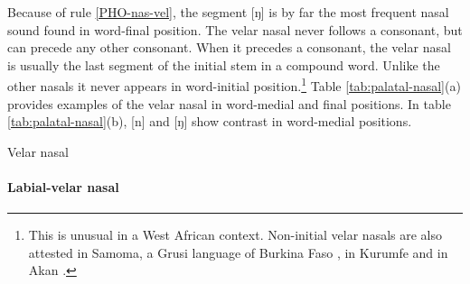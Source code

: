 Because of   rule  \ref{PHO-nas-vel}, the segment [ŋ] is by far the most
frequent nasal sound found in word-final position.  The velar nasal never
follows a consonant, but  can precede any other consonant. When it precedes a
consonant, the velar nasal is usually the last segment of the initial stem in a
compound word. Unlike the other nasals it never appears in word-initial
position.\footnote{This is unusual in  a West African context. Non-initial velar
nasals are also attested in Samoma, a Grusi language
of Burkina Faso
\cite[97]{Kedr97},  in Kurumfe \cite[389]{Renn97} and in Akan  \citep{Dolp88}.}
Table
\ref{tab:palatal-nasal}(a)  provides  examples of the velar nasal in word-medial
and
final positions. In table \ref{tab:palatal-nasal}(b),   [n] and [ŋ] show
contrast in word-medial  positions. 

\begin{table}[!htb]
\centering
\caption{Velar nasal\label{tab:velar-nasal}}

\quad
{}

\end{table}



\paragraph{Labial-velar nasal}


